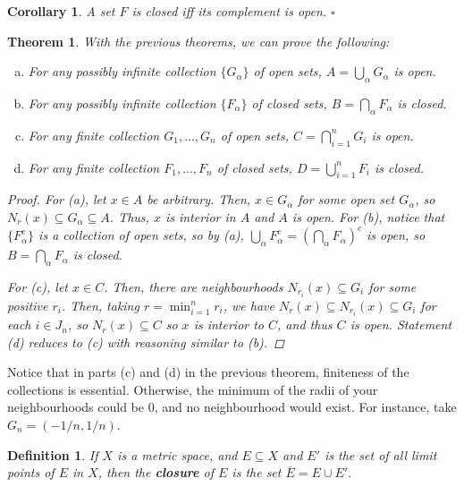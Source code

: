 \documentclass{scrbook}
\newcommand*{\qed}{\hfill\ensuremath{\square}}
\newtheorem{theorem}{Theorem}
\newtheorem{corollary}{Corollary}
\newtheorem{definition}{Definition}
\begin{document}
\begin{corollary}
A set $F$ is closed iff its complement is open. \qed
\end{corollary}

\begin{theorem}
With the previous theorems, we can prove the following:
\begin{enumerate}[(a)]
\item For any possibly infinite collection $\{G_\alpha\}$ of open sets, $A = \bigcup_\alpha G_\alpha$ is open.

\item For any possibly infinite collection $\{F_\alpha\}$ of closed sets, $B = \bigcap_\alpha F_\alpha$ is closed.

\item For any finite collection $G_1, \dotsc, G_n$ of open sets, $C = \bigcap_{i=1}^{n} G_i$ is open.

\item For any finite collection $F_1, \dotsc, F_n$ of closed sets, $D = \bigcup_{i=1}^{n} F_i$ is closed.
\end{enumerate}

\begin{proof}
For (a), let $x \in A$ be arbitrary. Then, $x \in G_\alpha$ for some open set $G_\alpha$, so $N_r(x) \subseteq G_\alpha \subseteq A$. Thus, $x$ is interior in $A$ and $A$ is open. For (b), notice that $\{F_\alpha^c\}$ is a collection of open sets, so by (a), $\bigcup_\alpha F_\alpha^c = \left(\bigcap_\alpha F_\alpha\right)^c$ is open, so $B = \bigcap_\alpha F_\alpha$ is closed.

For (c), let $x \in C$. Then, there are neighbourhoods $N_{r_i}(x) \subseteq G_i$ for some positive $r_i$. Then, taking $r = \min_{i=1}^{n} r_i$, we have $N_r(x) \subseteq N_{r_i}(x) \subseteq G_i$ for each $i \in J_n$, so $N_r(x) \subseteq C$ so $x$ is interior to $C$, and thus $C$ is open. Statement (d) reduces to (c) with reasoning similar to (b).
\end{proof}
\end{theorem}

Notice that in parts (c) and (d) in the previous theorem, finiteness of the collections is essential. Otherwise, the minimum of the radii of your neighbourhoods could be 0, and no neighbourhood would exist. For instance, take $G_n = (-1/n, 1/n)$.

\begin{definition}
If $X$ is a metric space, and $E \subseteq X$ and $E'$ is the set of all limit points of $E$ in $X$, then the \textbf{closure} of $E$ is the set $\overline{E} = E \cup E'$. 
\end{definition}
\end{document}
